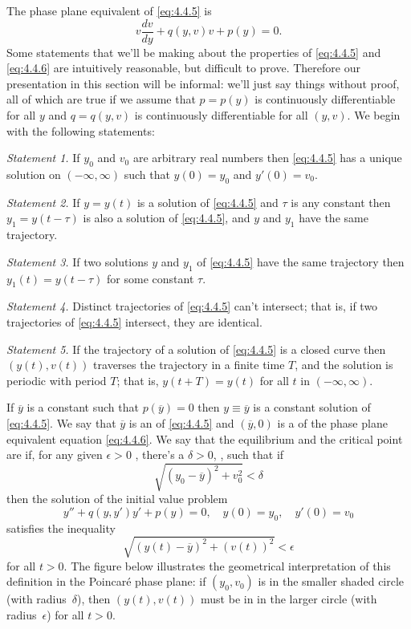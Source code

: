 \documentclass{ximera}
\begin{document}
The phase plane equivalent of \eqref{eq:4.4.5} is
\begin{equation} \label{eq:4.4.6}
v\frac{dv}{dy}+q(y,v)v+p(y)=0.
\end{equation}
Some  statements that we'll be making about the properties of
\eqref{eq:4.4.5} and \eqref{eq:4.4.6} are intuitively reasonable, but
difficult to prove.
Therefore our presentation in this section will be informal: we'll
just say things without proof, all of which are true if we assume that
$p=p(y)$ is continuously differentiable for all $y$ and $q=q(y,v)$ is
continuously differentiable for all $(y,v)$.
 We begin with the following statements:
 
\begin{fact}

\textit{Statement 1.} If $y_0$ and $v_0$ are arbitrary real numbers then
\eqref{eq:4.4.5} has a unique solution on $(-\infty,\infty)$ such that
$y(0)=y_0$ and $y'(0)=v_0$.
 
\textit{Statement 2.} If $y=y(t)$ is a solution of \eqref{eq:4.4.5}
and
$\tau$ is any constant then $y_1=y(t-\tau)$ is also a solution of
\eqref{eq:4.4.5}, and $y$ and $y_1$ have the same trajectory.
 
\textit{Statement 3.}   If two solutions $y$ and $y_1$ of
\eqref{eq:4.4.5} have the same trajectory then  $y_1(t)=y(t-\tau)$
for some constant $\tau$.
 
\textit{Statement 4.} Distinct trajectories of \eqref{eq:4.4.5} can't
intersect; that is, if two trajectories of \eqref{eq:4.4.5}
intersect,  they are identical.
 
 
\textit{Statement 5.} If the trajectory of a solution of
\eqref{eq:4.4.5}
is a closed curve then  $(y(t),v(t))$ traverses the
trajectory in a finite time $T$, and the solution is periodic with
period $T$; that is, $y(t+T)=y(t)$ for all $t$ in $(-\infty,\infty)$.
\end{fact}
 
 
If $\overline{y}$ is a constant such that $p(\overline{y})=0$ then
$y\equiv\overline{y}$ is a constant solution of \eqref{eq:4.4.5}. We say
that $\overline{y}$ is an  of \eqref{eq:4.4.5} and
 $(\overline{y},0)$ is a  of the phase plane
equivalent equation \eqref{eq:4.4.6}. We say that the equilibrium and
the critical point are  if, for any given $\epsilon>0$
, there's a $\delta>0$,
, such that if
$$
\sqrt{(y_0-\overline{y})^2+v_0^2}<\delta
$$
then the  solution of the initial value problem
$$
y''+q(y,y')y'+p(y)=0,\quad y(0)=y_0,\quad y'(0)=v_0
$$
satisfies the inequality
$$
\sqrt{(y(t)-\overline{y})^2+(v(t))^2}<\epsilon
$$
for all $t>0$. The figure below illustrates the geometrical
interpretation of this definition in the Poincar\'e phase plane: if
$(y_0,v_0)$ is in the smaller shaded circle (with radius~$\delta$), then
$(y(t),v(t))$ must be in in the larger circle (with
radius~$\epsilon$) for all $t>0$.
\end{document}
